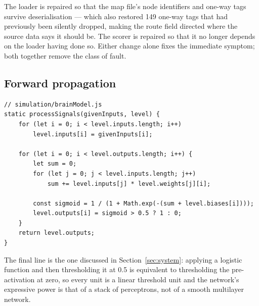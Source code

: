 \documentclass[conference]{IEEEtran}
\begin{document}
The loader is repaired so that the map file's node identifiers and one-way tags survive deserialisation — which also restored 149 one-way tags that had previously been silently dropped, making the route field directed where the source data says it should be. The scorer is repaired so that it no longer depends on the loader having done so. Either change alone fixes the immediate symptom; both together remove the class of fault.

\subsection{Forward propagation}

\begin{verbatim}
// simulation/brainModel.js
static processSignals(givenInputs, level) {
    for (let i = 0; i < level.inputs.length; i++)
        level.inputs[i] = givenInputs[i];

    for (let i = 0; i < level.outputs.length; i++) {
        let sum = 0;
        for (let j = 0; j < level.inputs.length; j++)
            sum += level.inputs[j] * level.weights[j][i];

        const sigmoid = 1 / (1 + Math.exp(-(sum + level.biases[i])));
        level.outputs[i] = sigmoid > 0.5 ? 1 : 0;
    }
    return level.outputs;
}
\end{verbatim}

The final line is the one discussed in Section~\ref{sec:system}: applying a logistic function and then thresholding it at 0.5 is equivalent to thresholding the pre-activation at zero, so every unit is a linear threshold unit and the network's expressive power is that of a stack of perceptrons, not of a smooth multilayer network.
\end{document}
